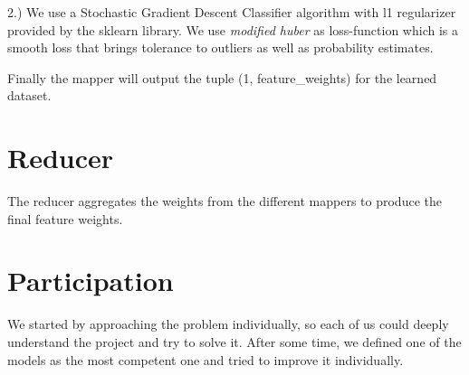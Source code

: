 \documentclass[a4paper, 11pt]{article}
\begin{document}
2.) We use a Stochastic Gradient Descent Classifier algorithm with l1 regularizer provided by the sklearn library. We use \textit{modified huber} as loss-function which is a smooth loss that brings tolerance to outliers as well as probability estimates.

Finally the mapper will output the tuple (1, feature\_weights) for the learned dataset.

\section{Reducer}

The reducer aggregates the weights from the different mappers to produce the final feature weights.

\section{Participation}

We started by approaching the problem individually, so each of us could deeply understand the project and try to solve it. After some time, we defined one of the models as the most competent one and tried to improve it individually.
\end{document}
